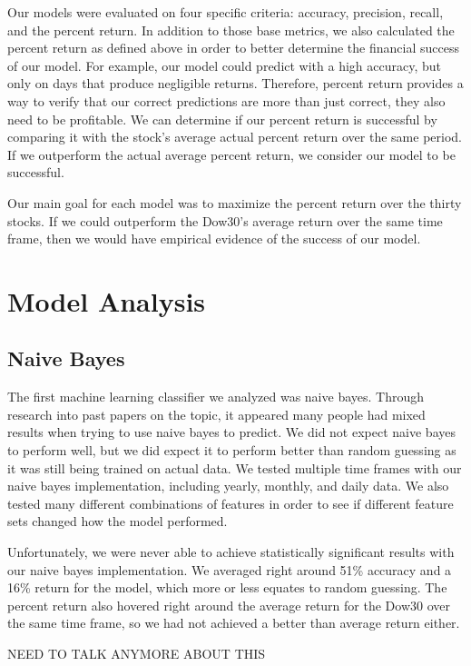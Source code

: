 \documentclass{article}
\begin{document}
Our models were evaluated on four specific criteria: accuracy, precision, recall, and the percent return. In addition to those base metrics, we also calculated the percent return as defined above in order to better determine the financial success of our model. For example, our model could predict with a high accuracy, but only on days that produce negligible returns. Therefore, percent return provides a way to verify that our correct predictions are more than just correct, they also need to be profitable. We can determine if our percent return is successful by comparing it with the stock's average actual percent return over the same period. If we outperform the actual average percent return, we consider our model to be successful.

Our main goal for each model was to maximize the percent return over the thirty stocks. If we could outperform the Dow30's average return over the same time frame, then we would have empirical evidence of the success of our model.

\section{Model Analysis}

\subsection{Naive Bayes}
The first machine learning classifier we analyzed was naive bayes. Through research into past papers on the topic, it appeared many people had mixed results when trying to use naive bayes to predict. We did not expect naive bayes to perform well, but we did expect it to perform better than random guessing as it was still being trained on actual data. We tested multiple time frames with our naive bayes implementation, including yearly, monthly, and daily data. We also tested many different combinations of features in order to see if different feature sets changed how the model performed.

Unfortunately, we were never able to achieve statistically significant results with our naive bayes implementation. We averaged right around 51\% accuracy and a 16\% return for the model, which more or less equates to random guessing. The percent return also hovered right around the average return for the Dow30 over the same time frame, so we had not achieved a better than average return either.

NEED TO TALK ANYMORE ABOUT THIS
\end{document}
